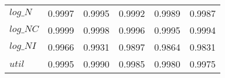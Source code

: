 \begin{center}
\begin{longtable}{lccccc}
$log\_N          $	 & 	     0.9997	 & 	     0.9995	 & 	     0.9992	 & 	     0.9989	 & 	     0.9987 \\ 
$log\_NC         $	 & 	     0.9999	 & 	     0.9998	 & 	     0.9996	 & 	     0.9995	 & 	     0.9994 \\ 
$log\_NI         $	 & 	     0.9966	 & 	     0.9931	 & 	     0.9897	 & 	     0.9864	 & 	     0.9831 \\ 
${util}          $	 & 	     0.9995	 & 	     0.9990	 & 	     0.9985	 & 	     0.9980	 & 	     0.9975 \\ 
\end{longtable}
 \end{center}
